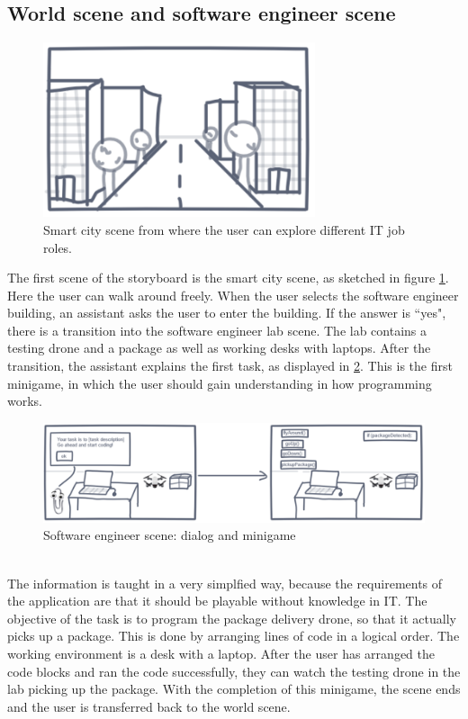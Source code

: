 \subsection{World scene and software engineer scene}
\begin{figure}[h!]
  \includegraphics[width=8cm]{kapitel/storyboard/smart-city.pdf}
  \centering
  \caption{Smart city scene from where the user can explore different IT job roles.}
  \label{fig:smartcity}
\end{figure}
The first scene of the storyboard is the smart city scene, as sketched in figure \ref{fig:smartcity}. Here the user can walk around freely. When the user selects the software engineer building, an assistant asks the user to enter the building. If the answer is ``yes", there is a transition into the software engineer lab scene. The lab contains a testing drone and a package as well as working desks with laptops. After the transition, the assistant explains the first task, as displayed in \ref{fig:sescene}. This is the first minigame, in which the user should gain understanding in how programming works.
\begin{figure}[h!]
  \includegraphics[width=16cm]{kapitel/storyboard/se-scene.pdf}
  \centering
  \caption{Software engineer scene: dialog and minigame}
  \label{fig:sescene}
\end{figure}
\\The information is taught in a very simplfied way, because the requirements of the application are that it should be playable without knowledge in IT. The objective of the task is to program the package delivery drone, so that it actually picks up a package. This is done by arranging lines of code in a logical order. The working environment is a desk with a laptop. After the user has arranged the code blocks and ran the code successfully, they can watch the testing drone in the lab picking up the package. With the completion of this minigame, the scene ends and the user is transferred back to the world scene.
